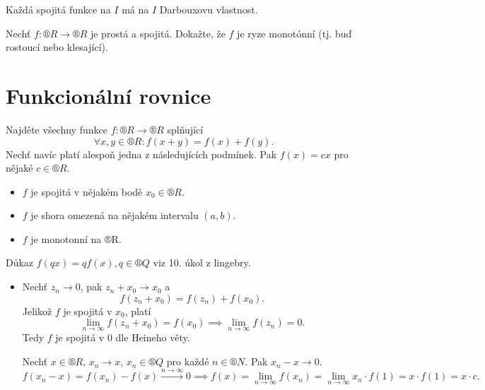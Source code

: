 \documentclass[12pt]{article}					%
\begin{document}
    \begin{veta}[Z přednášky]
        Každá spojitá funkce na $I$ má na $I$ Darbouxovu vlastnost.
    \end{veta}


    \begin{priklad}
        Nechť $f: ®R \rightarrow ®R$ je prostá a spojitá. Dokažte, že $f$ je ryze monotónní (tj. buď rostoucí nebo klesající).
    \end{priklad}

\section{Funkcionální rovnice}
    \begin{veta}
        Najděte všechny funkce $f: ®R \rightarrow ®R$ splňující
        $$ \forall x, y \in ®R: f(x+y) = f(x) + f(y). $$
        Nechť navíc  platí alespoň jedna z následujících podmínek. Pak $f(x) = cx$ pro nějaké $c \in ®R$.
        
        \begin{itemize}
            \item $f$ je spojitá v nějakém bodě $x_0 \in ®R$.
            \item $f$ je shora omezená na nějakém intervalu $(a, b)$.
            \item $f$ je monotonní na ®R.
        \end{itemize}

        \begin{dukazin}
            Důkaz $f(qx) = qf(x), q \in ®Q$ viz 10. úkol z lingebry.

            \begin{itemize}
                \item Nechť $z_n \rightarrow 0$, pak $z_n + x_0 \rightarrow x_0$ a
                    $$ f(z_n + x_0) = f(z_n) + f(x_0). $$ 
                    Jelikož $f$ je spojitá v $x_0$, platí 
                    $$ \lim_{n \rightarrow ∞} f(z_n + x_0) = f(x_0) \implies \lim_{n \rightarrow ∞} f(z_n) = 0. $$
                    Tedy $f$ je spojitá v 0 dle Heineho věty.

                    Nechť $x \in ®R$, $x_n \rightarrow x$, $x_n \in ®Q$ pro každé $n \in ®N$. Pak $x_n - x \rightarrow 0$.
                    $$ f(x_n - x) = f(x_n) - f(x) \overset{n\rightarrow ∞}{\longrightarrow} 0 \implies f(x) = \lim_{n \rightarrow ∞} f(x_n) = \lim_{n \rightarrow ∞} x_n·f(1) = x·f(1) = x·c. $$
                

\end{itemize}
\end{dukazin}
\end{veta}
\end{document}
